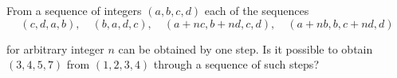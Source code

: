 From a sequence of integers $(a, b, c, d)$ each of the sequences\[(c, d, a, b),\quad (b, a, d, c),\quad (a + nc, b + nd, c, d),\quad (a + nb, b, c + nd, d)\]

for arbitrary integer $n$ can be obtained by one step. Is it possible to obtain $(3, 4, 5, 7)$ from $(1, 2, 3, 4)$ through a sequence of such steps?